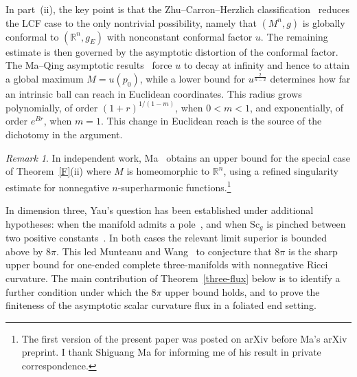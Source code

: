 \documentclass[12pt,oneside,a4paper]{article}
\theoremstyle{mytheorem}
\theoremstyle{remark}
\newtheorem{remark}[definition]{Remark}
\begin{document}
In part~(ii), the key point is that the Zhu--Carron--Herzlich
classification~\cite{zbMATH05042496} reduces the LCF case
to the only nontrivial possibility, namely that $(M^n,g)$ is globally conformal
to $(\mathbb{R}^n,g_E)$ with nonconstant conformal factor $u$. The remaining estimate is then governed by the
asymptotic distortion of the conformal factor. The Ma--Qing
asymptotic results~\cite{zbMATH07420360} force $u$ to decay at infinity and
hence to attain a global maximum $M=u(p_0)$, while a lower bound for
$u^{\frac{2}{n-2}}$ determines how far an intrinsic ball can reach in Euclidean
coordinates. This radius grows polynomially, of order $(1+r)^{1/(1-m)}$, when
$0<m<1$, and exponentially, of order $e^{Br}$, when $m=1$. This change in
Euclidean reach is the source of the dichotomy in the argument.



\begin{remark}
In independent work, Ma~\cite{2026arXiv260613979M} obtains an upper bound for the special case of Theorem~\ref{F}(ii) where $M$ is homeomorphic to $\mathbb R^n$, using a refined singularity estimate for nonnegative $n$-superharmonic functions.\footnote{The first version of the present paper was posted on arXiv before Ma's arXiv preprint. I thank Shiguang Ma for informing me of his result in private correspondence.}
\end{remark}







In dimension three, Yau's question has been established under additional
hypotheses: when the manifold admits a pole~\cite{MR4802637}, and when
$\mathrm{Sc}_g$ is pinched between two positive constants~\cite{2025arXiv250510520M}.
In both cases the relevant limit superior is bounded above by $8\pi$.
This led Munteanu and Wang~\cite[Conjecture~1.3]{2025arXiv250510520M} to
conjecture that $8\pi$ is the sharp upper bound for one-ended complete
three-manifolds with nonnegative Ricci curvature.  The main contribution of Theorem~\ref{three-flux} below is to identify a further condition under which the $8\pi$ upper bound holds, and to prove the finiteness of the asymptotic scalar curvature flux in a foliated end setting.
\end{document}
